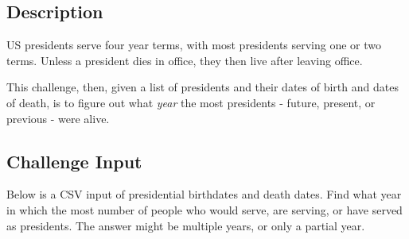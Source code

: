 \subsection*{Description}\label{description-32}

US presidents serve four year terms, with most presidents serving one or
two terms. Unless a president dies in office, they then live after
leaving office.

This challenge, then, given a list of presidents and their dates of
birth and dates of death, is to figure out what \emph{year} the most
presidents - future, present, or previous - were alive.

\subsection*{Challenge Input}\label{challenge-input-26}

Below is a CSV input of presidential birthdates and death dates. Find
what year in which the most number of people who would serve, are
serving, or have served as presidents. The answer might be multiple
years, or only a partial year.


